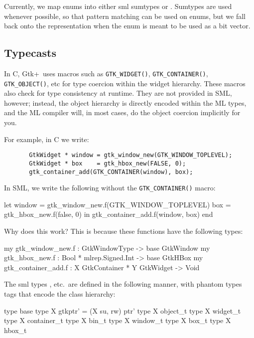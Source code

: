 \documentclass{article}
\newcommand{\gtk}{\mbox{\sf Gtk+}}
\begin{document}
    Currently, we map enums into either sml sumtypes or 
.   Sumtypes are used whenever possible, so that
pattern matching can be used on enums, but we fall back onto the 
 representation when the enum is meant to be used as a 
bit vector.
 
\subsection{Typecasts}
   In C, \gtk\ uses macros such as \verb|GTK_WIDGET()|, 
    \verb|GTK_CONTAINER()|, \verb|GTK_OBJECT()|,
   etc for type coercion within the widget hierarchy.  
   These macros also check for type consistency at runtime.   
   They are not provided in SML, however; instead, the object hierarchy 
   is directly encoded within the ML types, and the ML compiler will,
   in most cases, do the object coercion implicitly for you.

   For example, in C we write:
  \begin{verbatim}
       GtkWidget * window = gtk_window_new(GTK_WINDOW_TOPLEVEL);
       GtkWidget * box    = gtk_hbox_new(FALSE, 0);
       gtk_container_add(GTK_CONTAINER(window), box);
  \end{verbatim}

   In SML, we write the following without the \verb|GTK_CONTAINER()| macro:

  \begin{smldisp}
       let 
           window = gtk_window_new.f(GTK_WINDOW_TOPLEVEL)
           box    = gtk_hbox_new.f(false, 0)
       in  
           gtk_container_add.f(window, box)
       end
  \end{smldisp}

   Why does this work?  This is because these functions have the following
   types:

   \begin{smldisp}
       my gtk_window_new.f    : GtkWindowType -> base GtkWindow
       my gtk_hbox_new.f      : Bool * mlrep.Signed.Int -> base GtkHBox
       my gtk_container_add.f : X GtkContainer * Y GtkWidget -> Void
   \end{smldisp}

   The sml types ,  etc.~are 
defined in the following manner, with phantom types tags that
encode the class hierarchy:

    \begin{smldisp}
       type base
       type X gtkptr' = (X su, rw) ptr'
       type X object_t
       type X widget_t
       type X container_t
       type X bin_t
       type X window_t
       type X box_t
       type X hbox_t
    \end{smldisp}
\end{document}
